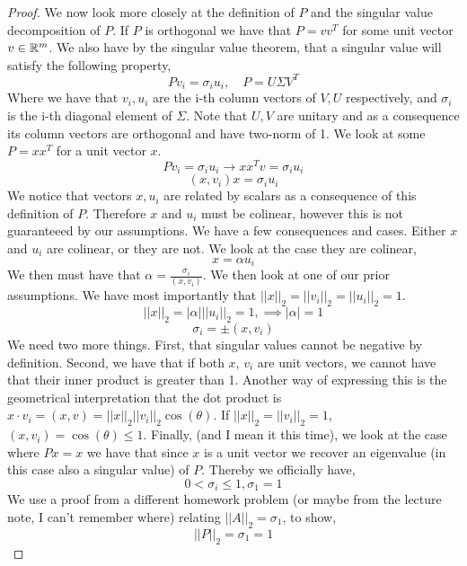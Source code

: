\documentclass{article}
\begin{document}
\begin{enumerate}
\begin{enumerate}
\begin{proof}
        We now look more closely at the definition of $P$ and the singular value decomposition of $P$. If $P$ is orthogonal we have that $P = vv^T$ for some unit vector $v \in \mathbb{R}^m$. We also have by the singular value theorem, that a singular value will satisfy the following property, 
        \[
            Pv_i = \sigma_iu_i, \quad P = U\Sigma V^T
        \]
        Where we have that $v_i, u_i$ are the i-th column vectors of $V, U$ respectively, and $\sigma_i$ is the i-th diagonal element of $\Sigma$. Note that $U, V$ are unitary and as a consequence its column vectors are orthogonal and have two-norm of 1. We look at some $P = xx^T$ for a unit vector $x$. 
        \[
            Pv_i = \sigma_iu_i \to xx^Tv = \sigma_iu_i
        \]
        \[
            (x, v_i) x = \sigma_i u_i
        \]
        We notice that vectors $x, u_i$ are related by scalars as a consequence of this definition of $P$. Therefore $x$ and $u_i$ must be colinear, however this is not guaranteeed by our assumptions. We have a few consequences and cases. Either $x$ and $u_i$ are colinear, or they are not. We look at the case they are colinear, 
        \[
            x = \alpha u_i
        \]
        We then must have that $\alpha = \frac{\sigma_i}{(x, v_i)}$. We then look at one of our prior assumptions. We have most importantly that $||x||_2 = ||v_i||_2 = ||u_i||_2 = 1$. 
        \[
            ||x||_2 = |\alpha|||u_i||_2 = 1, \implies |\alpha| = 1
        \]
        \[
            \sigma_i = \pm (x, v_i)
        \]
        We need two more things. First, that singular values cannot be negative by definition. Second, we have that if both $x$, $v_i$ are unit vectors, we cannot have that their inner product is greater than 1. Another way of expressing this is the geometrical interpretation that the dot product is $x \cdot v_i = (x, v) = ||x||_2||v_i||_2\cos(\theta)$. If $||x||_2 = ||v_i||_2 = 1$, $(x, v_i) = \cos(\theta) \le 1$. Finally, (and I mean it this time), we look at the case where $Px = x$ we have that since $x$ is a unit vector we recover an eigenvalue (in this case also a singular value) of $P$. Thereby we officially have, 
        \[
            0 < \sigma_i \le 1, \sigma_1 = 1
        \] 
        We use a proof from a different homework problem (or maybe from the lecture note, I can't remember where) relating $||A||_2 = \sigma_1$, to show, 
        \[
            ||P||_2 = \sigma_1 = 1
        \]


\end{proof}
\end{enumerate}
\end{enumerate}
\end{document}
